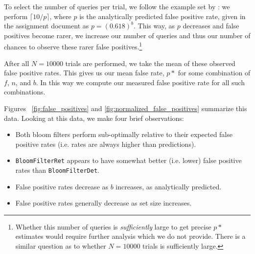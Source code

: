\documentclass{article}
\begin{document}
To select the number of queries per trial, we follow the example set by
\cite{kirsch2006less}: we perform $\lceil 10 / p \rceil$, where $p$ is the
analytically predicted false positive rate, given in the assignment document as
$p = (0.618)^b$. This way, as $p$ decreases and false positives become rarer, we
increase our number of queries and thus our number of chances to observe these
rarer false positives.\footnote{
  Whether this number of queries is \textit{sufficiently} large to get precise
  $p*$ estimates would require further analysis which we do not provide. There
  is a similar question as to whether $N = 10000$ trials is sufficiently large.
}

After all $N = 10000$ trials are performed, we take the mean of these observed
false positive rates. This gives us our mean false rate, $p*$ for some
combination of $f$, $n$, and $b$. In this way we compute our measured false
positive rate for all such combinations.

Figures ~\ref{fig:false_positives} and \ref{fig:normalized_false_positives}
summarize this data. Looking at this data, we make four brief observations:

\begin{itemize}
  \item Both bloom filters perform sub-optimally relative to their expected
        false positive rates (i.e. rates are always higher than predictions).
  \item \texttt{BloomFilterRet} appears to have somewhat better (i.e. lower)
        false positive rates than \texttt{BloomFilterDet}.
  \item False positive rates decrease as $b$ increases, as analytically
        predicted.
  \item False positive rates generally decrease as set size increases.
\end{itemize}
\end{document}

